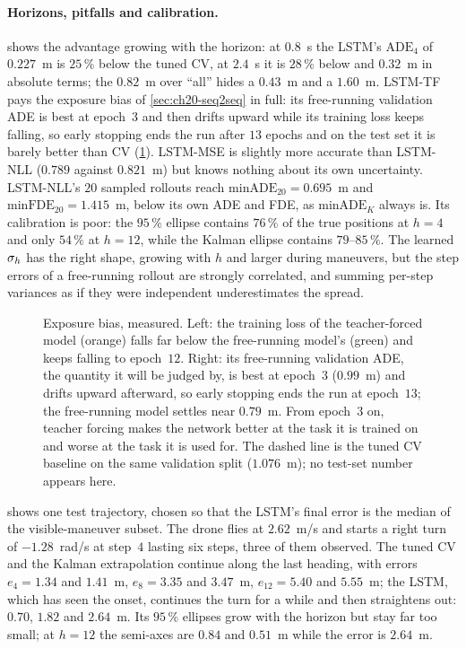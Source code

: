 \paragraph{Horizons, pitfalls and calibration.}
 shows the advantage growing with the horizon: at
$0.8$~s the LSTM's $\mathrm{ADE}_4$ of $0.227$~m is $25\,\%$ below the tuned
CV, at $2.4$~s it is $28\,\%$ below and $0.32$~m in absolute terms; the
$0.82$~m over ``all'' hides a $0.43$~m and a $1.60$~m. LSTM-TF pays the
exposure bias of \cref{sec:ch20-seq2seq} in full: its free-running validation
ADE is best at epoch~$3$ and then drifts upward while its training loss keeps
falling, so early stopping ends the run after $13$ epochs and on the test set
it is barely better than CV (\cref{fig:ch20-training}). LSTM-MSE is slightly
more accurate than LSTM-NLL ($0.789$ against $0.821$~m) but knows nothing
about its own uncertainty. LSTM-NLL's $20$ sampled rollouts reach
$\mathrm{minADE}_{20} = 0.695$~m and $\mathrm{minFDE}_{20} = 1.415$~m, below
its own ADE and FDE, as $\mathrm{minADE}_K$ always is. Its calibration is
poor: the $95\,\%$ ellipse contains $76\,\%$ of the true positions at $h = 4$
and only $54\,\%$ at $h = 12$, while the Kalman ellipse contains
$79$--$85\,\%$. The learned $\mathbf{\sigma}_h$ has the right shape, growing
with $h$ and larger during maneuvers, but the step errors of a free-running
rollout are strongly correlated, and summing per-step variances as if they
were independent underestimates the spread.

\begin{figure}[tb]
  \centering
  \caption{Exposure bias, measured. Left: the training loss of the
  teacher-forced model (orange) falls far below the free-running model's
  (green) and keeps falling to epoch~$12$. Right: its free-running validation
  ADE, the quantity it will be judged by, is best at epoch~$3$ ($0.99$~m) and
  drifts upward afterward, so early stopping ends the run at epoch~$13$;
  the free-running model settles near $0.79$~m. From epoch~$3$ on, teacher
  forcing makes the network better at the task it is trained on and worse at
  the task it is used for. The dashed line is the tuned CV baseline on the
  same validation split ($1.076$~m); no test-set number appears here.}
  \label{fig:ch20-training}
\end{figure}

 shows one test trajectory, chosen so that the LSTM's
final error is the median of the visible-maneuver subset. The drone flies at
$2.62$~m/s and starts a right turn of $-1.28$~rad/s at step~$4$ lasting six
steps, three of them observed. The tuned CV and the Kalman extrapolation
continue along the last heading, with errors $e_4 = 1.34$ and $1.41$~m,
$e_8 = 3.35$ and $3.47$~m, $e_{12} = 5.40$ and $5.55$~m; the LSTM, which has
seen the onset, continues the turn for a while and then straightens out:
$0.70$, $1.82$ and $2.64$~m. Its $95\,\%$ ellipses grow with the horizon but
stay far too small; at $h = 12$ the semi-axes are $0.84$ and $0.51$~m while
the error is $2.64$~m.


